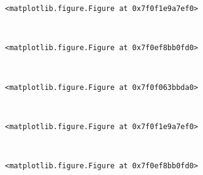 \documentclass[11pt]{article}
\begin{document}
    
    \begin{verbatim}
<matplotlib.figure.Figure at 0x7f0f1e9a7ef0>
    \end{verbatim}

    
    \begin{center}
    \end{center}
    { \hspace*{\fill} \\}
    
    
    \begin{verbatim}
<matplotlib.figure.Figure at 0x7f0ef8bb0fd0>
    \end{verbatim}

    
    \begin{center}
    \end{center}
    { \hspace*{\fill} \\}
    
    
    \begin{verbatim}
<matplotlib.figure.Figure at 0x7f0f063bbda0>
    \end{verbatim}

    
    \begin{center}
    \end{center}
    { \hspace*{\fill} \\}
    
    
    \begin{verbatim}
<matplotlib.figure.Figure at 0x7f0f1e9a7ef0>
    \end{verbatim}

    
    \begin{center}
    \end{center}
    { \hspace*{\fill} \\}
    
    
    \begin{verbatim}
<matplotlib.figure.Figure at 0x7f0ef8bb0fd0>
    \end{verbatim}

    
    \begin{center}
    \end{center}
    { \hspace*{\fill} \\}
    
\end{document}
